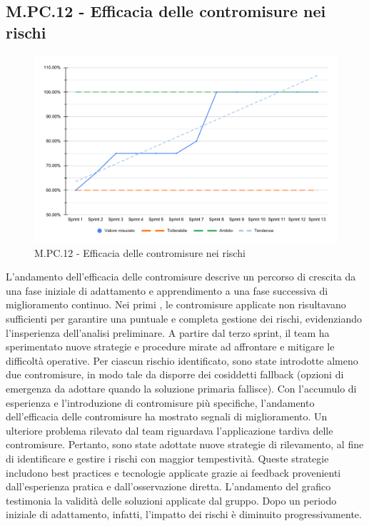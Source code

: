 \subsection{M.PC.12 - Efficacia delle contromisure nei rischi}
\begin{figure}[H]
    \centering
    \includegraphics[width=\textwidth]{assets/efficacia_contromisure.pdf}
    \caption{M.PC.12 - Efficacia delle contromisure nei rischi}
\end{figure}

\par L'andamento dell'efficacia delle contromisure descrive un percorso di crescita da una fase iniziale di adattamento e apprendimento a una fase successiva di miglioramento continuo. Nei primi , le contromisure applicate non risultavano sufficienti per garantire una puntuale e completa gestione dei rischi, evidenziando l'insperienza dell'analisi preliminare. A partire dal terzo sprint, il team ha sperimentato nuove strategie e procedure mirate ad affrontare e mitigare le difficoltà operative. Per ciascun rischio identificato, sono state introdotte almeno due contromisure, in modo tale da disporre dei cosiddetti fallback (opzioni di emergenza da adottare quando la soluzione primaria fallisce). Con l'accumulo di esperienza e l'introduzione di contromisure più specifiche, l'andamento dell'efficacia delle contromisure ha mostrato segnali di miglioramento. Un ulteriore problema rilevato dal team riguardava l'applicazione tardiva delle contromisure. Pertanto, sono state adottate nuove strategie di rilevamento, al fine di identificare e gestire i rischi con maggior tempestività. Queste strategie includono best practices e tecnologie applicate grazie ai feedback provenienti dall'esperienza pratica e dall'osservazione diretta. L'andamento del grafico testimonia la validità delle soluzioni applicate dal gruppo. Dopo un periodo iniziale di adattamento, infatti, l'impatto dei rischi è diminuito progressivamente. 
